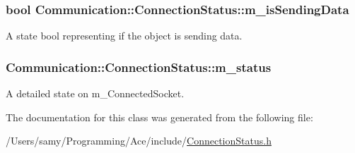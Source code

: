 \subsubsection[{m\+\_\+is\+Sending\+Data}]{\setlength{\rightskip}{0pt plus 5cm}bool Communication\+::\+Connection\+Status\+::m\+\_\+is\+Sending\+Data\hspace{0.3cm}{\ttfamily [private]}}\label{class_communication_1_1_connection_status_aeb89ad295c5f513ee4388a6e8fe8b997}


A state bool representing if the object is sending data. 

\hypertarget{class_communication_1_1_connection_status_a91fdffcdf89271aec6f7943e44776cc9}{}
\subsubsection[{m\+\_\+status}]{ Communication\+::\+Connection\+Status\+::m\+\_\+status\hspace{0.3cm}{\ttfamily [private]}}\label{class_communication_1_1_connection_status_a91fdffcdf89271aec6f7943e44776cc9}


A detailed state on m\+\_\+\+Connected\+Socket. 



The documentation for this class was generated from the following file\+:\begin{DoxyCompactItemize}
\item 
/\+Users/samy/\+Programming/\+Ace/include/\hyperlink{_connection_status_8h}{Connection\+Status.\+h}\end{DoxyCompactItemize}
